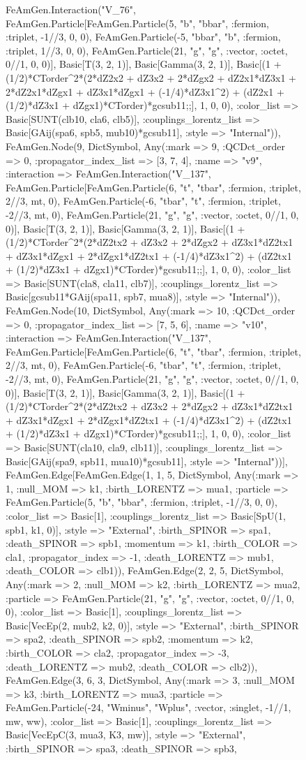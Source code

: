 \documentclass{revtex4}
\begin{document}
\begin{figure}[!htb]
\begin{center}
{FeAmGen.Interaction("V_76", FeAmGen.Particle[FeAmGen.Particle(5, "b", "bbar", :fermion, :triplet, -1//3, 0, 0), FeAmGen.Particle(-5, "bbar", "b", :fermion, :triplet, 1//3, 0, 0), FeAmGen.Particle(21, "g", "g", :vector, :octet, 0//1, 0, 0)], Basic[T(3, 2, 1)], Basic[Gamma(3, 2, 1)], Basic[(1 + (1/2)*CTorder^2*(2*dZ2x2 + dZ3x2 + 2*dZgx2 + dZ2x1*dZ3x1 + 2*dZ2x1*dZgx1 + dZ3x1*dZgx1 + (-1/4)*dZ3x1^2) + (dZ2x1 + (1/2)*dZ3x1 + dZgx1)*CTorder)*gcsub11;;], 1, 0, 0), :color_list => Basic[SUNT(clb10, cla6, clb5)], :couplings_lorentz_list => Basic[GAij(spa6, spb5, mub10)*gcsub11], :style => "Internal")), FeAmGen.Node(9, Dict{Symbol, Any}(:mark => 9, :QCDct_order => 0, :propagator_index_list => [3, 7, 4], :name => "v9", :interaction => FeAmGen.Interaction("V_137", FeAmGen.Particle[FeAmGen.Particle(6, "t", "tbar", :fermion, :triplet, 2//3, mt, 0), FeAmGen.Particle(-6, "tbar", "t", :fermion, :triplet, -2//3, mt, 0), FeAmGen.Particle(21, "g", "g", :vector, :octet, 0//1, 0, 0)], Basic[T(3, 2, 1)], Basic[Gamma(3, 2, 1)], Basic[(1 + (1/2)*CTorder^2*(2*dZ2tx2 + dZ3x2 + 2*dZgx2 + dZ3x1*dZ2tx1 + dZ3x1*dZgx1 + 2*dZgx1*dZ2tx1 + (-1/4)*dZ3x1^2) + (dZ2tx1 + (1/2)*dZ3x1 + dZgx1)*CTorder)*gcsub11;;], 1, 0, 0), :color_list => Basic[SUNT(cla8, cla11, clb7)], :couplings_lorentz_list => Basic[gcsub11*GAij(spa11, spb7, mua8)], :style => "Internal")), FeAmGen.Node(10, Dict{Symbol, Any}(:mark => 10, :QCDct_order => 0, :propagator_index_list => [7, 5, 6], :name => "v10", :interaction => FeAmGen.Interaction("V_137", FeAmGen.Particle[FeAmGen.Particle(6, "t", "tbar", :fermion, :triplet, 2//3, mt, 0), FeAmGen.Particle(-6, "tbar", "t", :fermion, :triplet, -2//3, mt, 0), FeAmGen.Particle(21, "g", "g", :vector, :octet, 0//1, 0, 0)], Basic[T(3, 2, 1)], Basic[Gamma(3, 2, 1)], Basic[(1 + (1/2)*CTorder^2*(2*dZ2tx2 + dZ3x2 + 2*dZgx2 + dZ3x1*dZ2tx1 + dZ3x1*dZgx1 + 2*dZgx1*dZ2tx1 + (-1/4)*dZ3x1^2) + (dZ2tx1 + (1/2)*dZ3x1 + dZgx1)*CTorder)*gcsub11;;], 1, 0, 0), :color_list => Basic[SUNT(cla10, cla9, clb11)], :couplings_lorentz_list => Basic[GAij(spa9, spb11, mua10)*gcsub11], :style => "Internal"))], FeAmGen.Edge[FeAmGen.Edge(1, 1, 5, Dict{Symbol, Any}(:mark => 1, :null_MOM => k1, :birth_LORENTZ => mua1, :particle => FeAmGen.Particle(5, "b", "bbar", :fermion, :triplet, -1//3, 0, 0), :color_list => Basic[1], :couplings_lorentz_list => Basic[SpU(1, spb1, k1, 0)], :style => "External", :birth_SPINOR => spa1, :death_SPINOR => spb1, :momentum => k1, :birth_COLOR => cla1, :propagator_index => -1, :death_LORENTZ => mub1, :death_COLOR => clb1)), FeAmGen.Edge(2, 2, 5, Dict{Symbol, Any}(:mark => 2, :null_MOM => k2, :birth_LORENTZ => mua2, :particle => FeAmGen.Particle(21, "g", "g", :vector, :octet, 0//1, 0, 0), :color_list => Basic[1], :couplings_lorentz_list => Basic[VecEp(2, mub2, k2, 0)], :style => "External", :birth_SPINOR => spa2, :death_SPINOR => spb2, :momentum => k2, :birth_COLOR => cla2, :propagator_index => -3, :death_LORENTZ => mub2, :death_COLOR => clb2)), FeAmGen.Edge(3, 6, 3, Dict{Symbol, Any}(:mark => 3, :null_MOM => k3, :birth_LORENTZ => mua3, :particle => FeAmGen.Particle(-24, "Wminus", "Wplus", :vector, :singlet, -1//1, mw, ww), :color_list => Basic[1], :couplings_lorentz_list => Basic[VecEpC(3, mua3, K3, mw)], :style => "External", :birth_SPINOR => spa3, :death_SPINOR => spb3, }
\end{center}
\end{figure}
\end{document}
